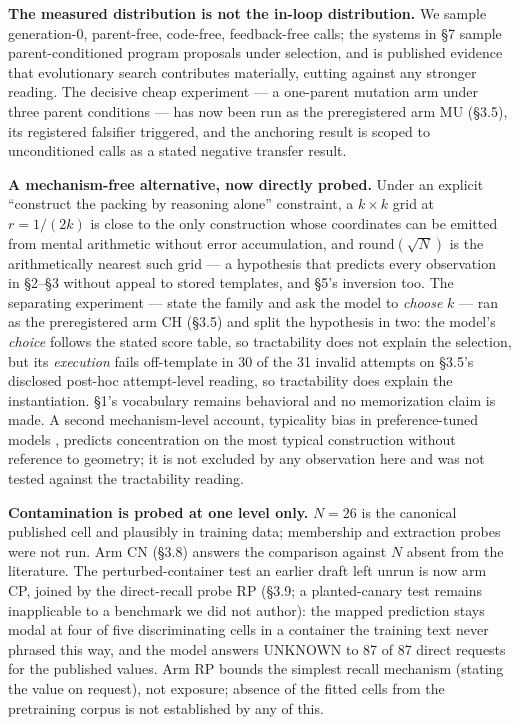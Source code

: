 \textbf{The measured distribution is not the in-loop distribution.} We sample generation-0,
parent-free, code-free, feedback-free calls; the systems in \S7 sample parent-conditioned program
proposals under selection, and \citet{zhang2024understandingimportanceevolutionarysearch} is
published evidence that evolutionary search contributes materially, cutting against any stronger
reading. The decisive cheap experiment --- a one-parent mutation arm under three parent conditions
--- has now been run as the preregistered arm MU (\S3.5), its registered falsifier triggered, and
the anchoring result is scoped to unconditioned calls as a stated negative transfer result.

\textbf{A mechanism-free alternative, now directly probed.} Under an explicit ``construct the
packing by reasoning alone'' constraint, a $k \times k$ grid at $r = 1/(2k)$ is close to the only
construction whose coordinates can be emitted from mental arithmetic without error accumulation,
and $\mathrm{round}(\sqrt{N})$ is the arithmetically nearest such grid --- a hypothesis that
predicts every observation in \S2--\S3 without appeal to stored templates, and \S5's inversion too.
The separating experiment --- state the family and ask the model to \emph{choose} $k$ --- ran as
the preregistered arm CH (\S3.5) and split the hypothesis in two: the model's \emph{choice} follows
the stated score table, so tractability does not explain the selection, but its \emph{execution}
fails off-template in 30 of the 31 invalid attempts on \S3.5's disclosed post-hoc
attempt-level reading, so tractability does explain the
instantiation. \S1's vocabulary remains behavioral and no memorization claim is made. A second
mechanism-level account, typicality bias in preference-tuned models
\citep{zhang2026verbalizedsamplingmitigatemode}, predicts concentration on the most typical
construction without reference to geometry; it is not excluded by any observation here and was not
tested against the tractability reading.

\textbf{Contamination is probed at one level only.} $N = 26$ is the canonical published cell and
plausibly in training data; membership and extraction probes
\citep{carlini2021extracting,golchin2024timetravel} were not run. Arm CN (\S3.8) answers the
comparison against $N$ absent from the literature. The perturbed-container test an earlier draft
left unrun is now arm CP, joined by the direct-recall probe RP (\S3.9; a planted-canary test
remains inapplicable to a benchmark we did not author): the mapped prediction stays modal at four of five discriminating cells
in a container the training text never phrased this way, and the model answers UNKNOWN to 87 of 87
direct requests for the published values. Arm RP bounds the simplest recall mechanism (stating
the value on request), not exposure; absence of the fitted cells from the pretraining corpus is
not established by any of this.

